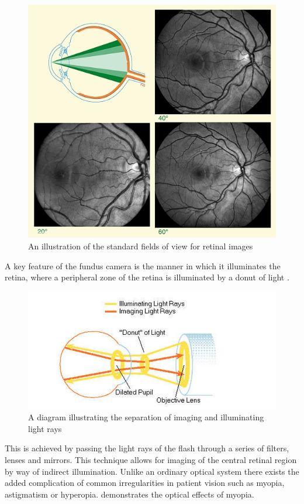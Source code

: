 \begin{figure}[htbp]
\centering
  \includegraphics{figures/fieldofview}
\caption{An illustration of the standard fields of view for retinal images 
}
\label{fig:fov}
\end{figure}

A key feature of the fundus camera is the manner in which it illuminates the retina, where a peripheral zone of the retina is illuminated by a donut of light .

\begin{figure}[htbp]
\centering
  \includegraphics{figures/lightdonut}
\caption{A diagram illustrating the separation of imaging and illuminating light rays}
\label{fig:ld}
\end{figure}
 

This is achieved by passing the light rays of the flash through a series of filters, lenses and mirrors. This technique allows for imaging of the central retinal region by way of indirect illumination. Unlike an ordinary optical system there exists the added complication of common irregularities in patient vision such as myopia, astigmatism or hyperopia.  demonstrates the optical effects of myopia.

